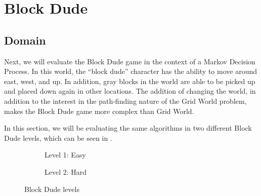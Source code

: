 \documentclass{article}
\begin{document}
  \section{Block Dude}

    \subsection{Domain}
      Next, we will evaluate the Block Dude game in the context of a Markov Decision Process. In this world, the ``block dude'' character has the ability to move around east, west, and up. In addition, gray blocks in the world are able to be picked up and placed down again in other locations. The addition of changing the world, in addition to the interest in the path-finding nature of the Grid World problem, makes the Block Dude game more complex than Grid World.

      In this section, we will be evaluating the same algorithms in two different Block Dude levels, which can be seen in .

      \begin{figure}[htb]
      \centering

        \begin{subfigure}{0.45\textwidth}
          \caption{Level 1: Easy}
        \end{subfigure}\hfil
        \begin{subfigure}{0.45\textwidth}
          \caption{Level 2: Hard}
        \end{subfigure}\hfil

      \caption{Block Dude levels}
      \label{fig:bd-domain}
      \end{figure}
\end{document}
